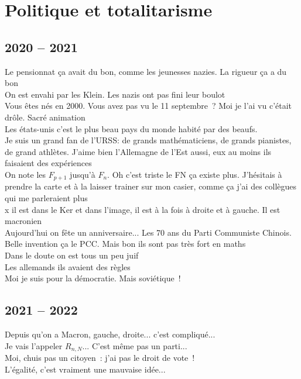 \documentclass[french, a4paper, openany]{book}
\begin{document}
\section*{Politique et totalitarisme}

	\subsection*{2020 -- 2021}
		\noindent \og Le pensionnat ça avait du bon, comme les jeunesses nazies. La rigueur ça a du bon \fg \\
		\og On est envahi par les Klein. Les nazis ont pas fini leur boulot \fg \\
		\og Vous êtes nés en 2000. Vous avez pas vu le 11 septembre~? Moi je l'ai vu c'était drôle. Sacré animation \fg \\
		\og Les états-unis c'est le plus beau pays du monde habité par des beaufs. \fg \\
		\og Je suis un grand fan de l'URSS: de grands mathématiciens, de grands pianistes, de grand athlètes. J'aime bien l'Allemagne de l'Est aussi, eux au moins ils faisaient des expériences \fg \\
		\og On note les $F_{p+1}$ jusqu'à $F_n$. Oh c'est triste le FN ça existe plus. J'hésitais à prendre la carte et à la laisser trainer sur mon casier, comme ça j'ai des collègues qui me parleraient plus \fg \\
		\og x il est dans le Ker et dans l'image, il est à la fois à droite et à gauche. Il est macronien \fg \\
		\og Aujourd'hui on fête un anniversaire... Les 70 ans du Parti Communiste Chinois. Belle invention ça le PCC. Mais bon ils sont pas très fort en maths \fg \\
		\og Dans le doute on est tous un peu juif \fg \\
		\og Les allemands ils avaient des règles \fg \\
		\og Moi je suis pour la démocratie. Mais soviétique~! \fg \\

	\subsection*{2021 -- 2022}
		\noindent \og Depuis qu'on a Macron, gauche, droite... c'est compliqué... \fg \\
		\og Je vais l'appeler $R_{n,N}$... C'est même pas un parti... \fg \\
		\og Moi, chuis pas un citoyen~: j'ai pas le droit de vote~! \fg \\
		\og L'égalité, c'est vraiment une mauvaise idée... \fg \\
\end{document}
